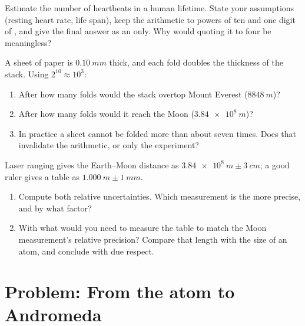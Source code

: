\begin{exercise}[$\star\star\star$]\label{exo:g10:orders-of-magnitude:13}
Estimate the number of heartbeats in a human lifetime. State your
assumptions (resting heart rate, life span), keep the arithmetic to
powers of ten and one digit of , and give the final answer as
an  only. Why would quoting it to four  be meaningless?
\end{exercise}

\begin{exercise}[$\star\star\star$]\label{exo:g10:orders-of-magnitude:14}
A sheet of paper is $\qty{0.10}{mm}$ thick, and each fold doubles the
thickness of the stack. Using $2^{10} \approx 10^{3}$:
\begin{enumerate}
  \item After how many folds would the stack overtop Mount Everest
        ($\qty{8848}{m}$)?
  \item After how many folds would it reach the Moon
        ($\qty{3.84e8}{m}$)?
  \item In practice a sheet cannot be folded more than about seven
        times. Does that invalidate the arithmetic, or only the
        experiment?
\end{enumerate}
\end{exercise}

\begin{exercise}[$\star\star\star$]\label{exo:g10:orders-of-magnitude:15}
Laser ranging gives the Earth--Moon distance as
$\qty{3.84e8}{m} \pm \qty{3}{cm}$; a good ruler gives a table as
$\qty{1.000}{m} \pm \qty{1}{mm}$.
\begin{enumerate}
  \item Compute both relative uncertainties. Which measurement is the
        more precise, and by what factor?
  \item With what  would you need to measure the
        table to match the Moon measurement's relative precision?
        Compare that length with the size of an atom, and conclude
        with due respect.
\end{enumerate}
\end{exercise}

\section{Problem: From the atom to Andromeda}

